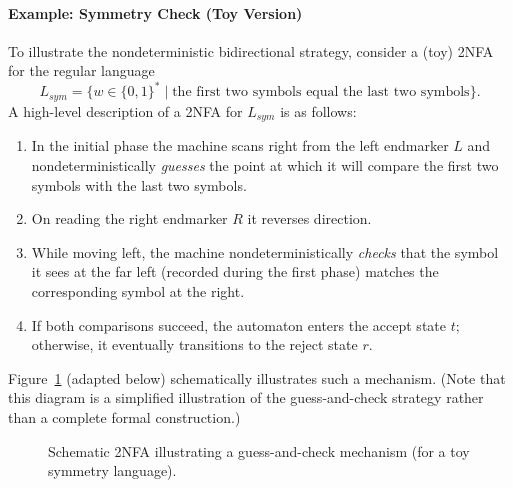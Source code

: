 \paragraph{Example: Symmetry Check (Toy Version)}
To illustrate the nondeterministic bidirectional strategy, consider a (toy) 2NFA for the regular language 
\[
L_{sym} = \{ w \in \{0,1\}^* \mid \mbox{the first two symbols equal the last two symbols} \}.
\]
A high-level description of a 2NFA for \(L_{sym}\) is as follows:
\begin{enumerate}
    \item In the initial phase the machine scans right from the left endmarker \(L\) and nondeterministically \emph{guesses} the point at which it will compare the first two symbols with the last two symbols.
    \item On reading the right endmarker \(R\) it reverses direction.
    \item While moving left, the machine nondeterministically \emph{checks} that the symbol it sees at the far left (recorded during the first phase) matches the corresponding symbol at the right.
    \item If both comparisons succeed, the automaton enters the accept state \(t\); otherwise, it eventually transitions to the reject state \(r\).
\end{enumerate}
Figure~\ref{fig:2nfa-example} (adapted below) schematically illustrates such a mechanism. (Note that this diagram is a simplified illustration of the guess-and-check strategy rather than a complete formal construction.)

\begin{figure}[h]
    \centering  
    \caption{Schematic 2NFA illustrating a guess-and-check mechanism (for a toy symmetry language).}
    \label{fig:2nfa-example}
\end{figure}

